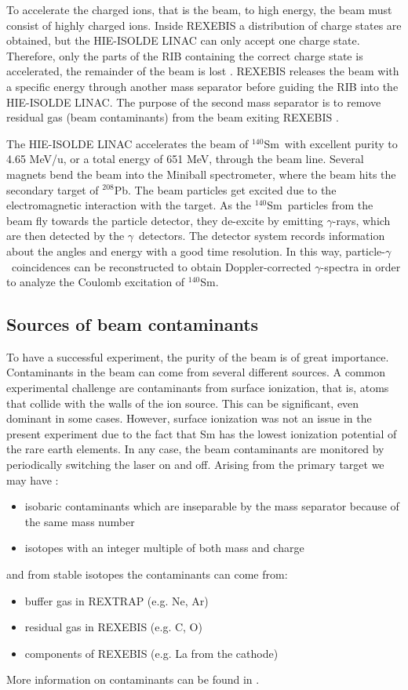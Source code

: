 \documentclass[twoside,english]{uiofysmaster/uiofysmaster}
\newcommand{\Sm}{$^{140}$Sm} %
\newcommand{\Pb}{$^{208}$Pb}
\newcommand{\ga}{$\gamma$}
\let\orgautoref\autoref
\renewcommand{\autoref}
        {%
		 \def\sectionautorefname{Section}%
		 \def\subsectionautorefname{Section}%
		 \def\subsubsectionautorefname{Section}%
		 \def\chapterautorefname{Chapter}%
          \orgautoref}
\begin{document}
To accelerate the charged ions, that is the beam, to high energy, the beam must consist of highly charged ions. 
Inside REXEBIS a distribution of charge states are obtained, but the HIE-ISOLDE LINAC can only accept one charge state.
Therefore, only the parts of the RIB containing the correct charge state is accelerated, the remainder of the beam is lost \cite{REX-web, HIE-web, EBIS2002, EBIS2010}.
REXEBIS releases the beam with a specific energy through another mass separator before guiding the RIB into the HIE-ISOLDE LINAC. 
The purpose of the second mass separator is to remove residual gas (beam contaminants) from the beam exiting REXEBIS \cite{HIE-ISOLDE}. 

The HIE-ISOLDE LINAC accelerates the beam of \Sm\ with excellent purity to 4.65 MeV/u, or a total energy of 651 MeV, through the beam line. 
Several magnets bend the beam into the Miniball spectrometer, where the beam hits the secondary target of \Pb. 
The beam particles get excited due to the electromagnetic interaction with the target.
As the \Sm\ particles from the beam fly towards the particle detector, they de-excite by emitting \ga-rays, which are then detected by the \ga\ detectors.
The detector system records information about the angles and energy with a good time resolution. 
In this way, particle-\ga\ coincidences can be reconstructed to obtain Doppler-corrected \ga-spectra  in order to analyze the Coulomb excitation of \Sm.


\subsection{Sources of beam contaminants}\label{ssec:bcontaminants}
To have a successful experiment, the purity of the beam is of great importance. Contaminants in the beam can come from several different sources. 
A common experimental challenge are contaminants from surface ionization, that is, atoms that collide with the walls of the ion source. 
This can be significant, even dominant in some cases. 
However, surface ionization was not an issue in the present experiment due to the fact that Sm has the lowest ionization potential of the rare earth elements. 
In any case, the beam contaminants are monitored by periodically switching the laser on and off.
Arising from the primary target we may have \cite{MB-spect}:
\begin{itemize}
	\item isobaric contaminants which are inseparable by the mass separator because of the same mass number
	\item isotopes with an integer multiple of both mass and charge
\end{itemize}
and from stable isotopes the contaminants can come from:
\begin{itemize}
	\item buffer gas in REXTRAP (e.g. Ne, Ar)
	\item residual gas in REXEBIS (e.g. C, O)
	\item components of REXEBIS (e.g. La from the cathode)
\end{itemize}
More information on contaminants can be found in \cite{HIE-ISOLDE, RILIS, MB-spect}.
\end{document}
